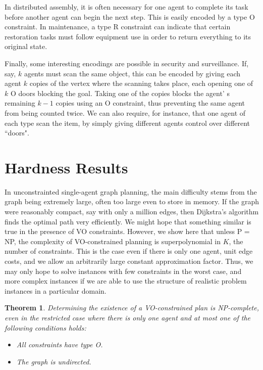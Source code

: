 \documentclass[letterpaper]{article}
\newtheorem{thm}{Theorem}
\begin{document}
In distributed assembly, it is often necessary for one agent to complete its task before another agent can begin the next step. This is easily encoded by a type O constraint. In maintenance, a type R constraint can indicate that certain restoration tasks must follow equipment use in order to return everything to its original state.

Finally, some interesting encodings are possible in security and surveillance. If, say, $k$ agents must scan the same object, this can be encoded by giving each agent $k$ copies of the vertex where the scanning takes place, each opening one of $k$ O doors blocking the goal. Taking one of the copies blocks the agent' s remaining $k-1$ copies using an O constraint, thus preventing the same agent from being counted twice. We can also require, for instance, that one agent of each type scan the item, by simply giving different agents control over different ``doors".

\section{Hardness Results}

In unconstrainted single-agent graph planning, the main difficulty stems from the graph being extremely large, often too large even to store in memory. If the graph were reasonably compact, say with only a million edges, then Dijkstra's algorithm finds the optimal path very efficiently. We might hope that something similar is true in the presence of VO constraints. However, we show here that unless P = NP, the complexity of VO-constrained planning is superpolynomial in $K$, the number of constraints. This is the case even if there is only one agent, unit edge costs, and we allow an arbitrarily large constant approximation factor. Thus, we may only hope to solve instances with few constraints in the worst case, and more complex instances if we are able to use the structure of realistic problem instances in a particular domain.

\begin{thm}
Determining the existence of a VO-constrained plan is NP-complete, even in the restricted case where there is only one agent and at most one of the following conditions holds:
\begin{itemize}
\item All constraints have type O.
\item The graph is undirected.
\end{itemize}
\end{thm}
\end{document}
